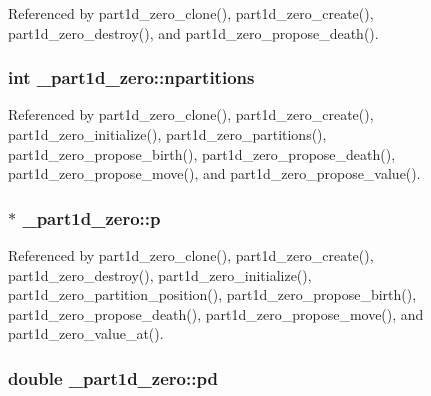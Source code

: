 Referenced by part1d\+\_\+zero\+\_\+clone(), part1d\+\_\+zero\+\_\+create(), part1d\+\_\+zero\+\_\+destroy(), and part1d\+\_\+zero\+\_\+propose\+\_\+death().

\subsubsection[{\texorpdfstring{npartitions}{npartitions}}]{\setlength{\rightskip}{0pt plus 5cm}int \+\_\+part1d\+\_\+zero\+::npartitions}\hypertarget{struct__part1d__zero_acce7923182d5ca81f5956ccde9807d14}{}\label{struct__part1d__zero_acce7923182d5ca81f5956ccde9807d14}


Referenced by part1d\+\_\+zero\+\_\+clone(), part1d\+\_\+zero\+\_\+create(), part1d\+\_\+zero\+\_\+initialize(), part1d\+\_\+zero\+\_\+partitions(), part1d\+\_\+zero\+\_\+propose\+\_\+birth(), part1d\+\_\+zero\+\_\+propose\+\_\+death(), part1d\+\_\+zero\+\_\+propose\+\_\+move(), and part1d\+\_\+zero\+\_\+propose\+\_\+value().

\subsubsection[{\texorpdfstring{p}{p}}]{$\ast$ \+\_\+part1d\+\_\+zero\+::p}\hypertarget{struct__part1d__zero_a77f81843128e319523a47a0d1a476515}{}\label{struct__part1d__zero_a77f81843128e319523a47a0d1a476515}


Referenced by part1d\+\_\+zero\+\_\+clone(), part1d\+\_\+zero\+\_\+create(), part1d\+\_\+zero\+\_\+destroy(), part1d\+\_\+zero\+\_\+initialize(), part1d\+\_\+zero\+\_\+partition\+\_\+position(), part1d\+\_\+zero\+\_\+propose\+\_\+birth(), part1d\+\_\+zero\+\_\+propose\+\_\+death(), part1d\+\_\+zero\+\_\+propose\+\_\+move(), and part1d\+\_\+zero\+\_\+value\+\_\+at().

\subsubsection[{\texorpdfstring{pd}{pd}}]{\setlength{\rightskip}{0pt plus 5cm}double \+\_\+part1d\+\_\+zero\+::pd}\hypertarget{struct__part1d__zero_a821c8c29d570d780856fe35e2f2deadd}{}\label{struct__part1d__zero_a821c8c29d570d780856fe35e2f2deadd}


